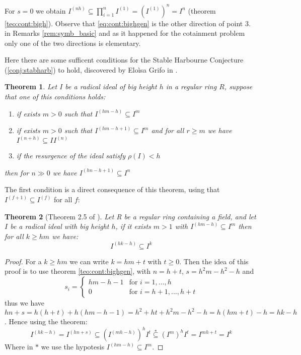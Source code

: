 \documentclass[]{book}
\theoremstyle{plain}
\newtheorem{teo}{Theorem}[section]
\theoremstyle{remark}
\theoremstyle{definition}
\newcommand{\cont}[2]{ I^{(#1)} \subseteq I^{#2}}
\begin{document}
For $ s=0 $ we obtain $ I^{(nh)} \subseteq \prod_{i=1}^{n} I^{(1)} = ( I^{(1)} )^n = I^n$ (theorem \ref{teo:cont:bigh}). Observe that \ref{eq:cont:bighgen} is the other direction of point $ 3. $ in Remarks \ref{rem:symb_basic} and as it happened for the cotainment problem only one of the two directions is elementary. 



Here there are some sufficent conditions for the Stable Harbourne Conjecture (\ref{conj:stabharb}) to hold, discovered by Eloìsa Grifo in \cite{Grifo20}. 


\begin{teo} \label{teo:cont:grifo0}
Let $ I $ be a radical ideal of big height $ h $ in a regular ring $ R $, suppose that one of this conditions holds:
\begin{enumerate}
\item if exists $ m>0 $ such that $ \cont{hm - h}{m} $
\item if exists $ m>0 $ such that $ \cont{hm - h +1 }{m} $ and for all $ r \geq m $ we have $ \cont{n+h }{ }I^{(n)}$
\item if the resurgence of the ideal satisfy $ \rho(I) < h $
\end{enumerate}
then for $ n \gg 0  $ we have $ \cont{hn - h +1}{n} $
\end{teo}

The first condition is a direct consequence of this theorem, using that $ \cont{f+1}{(f)} $ for all $ f $:

\begin{teo}[Theorem 2.5 of \cite{Grifo20}] \label{teo:cont:grifo1}
Let R be a regular ring containing a field, and let $ I $ be a radical ideal with big height $ h $, if it exists $ m>1 $ with $ \cont{hm -h}{m} $ then for all $ k \geq hm $ we have:
$$ \cont{hk - h}{k} $$
\end{teo}

\begin{proof}
For a $ k\geq hm  $ we can write $ k = hm + t $ with $ t\geq 0 $. Then the idea of this proof is to use theorem \ref{teo:cont:bighgen}, with $ n= h+ t $, $ s = h^2m - h^2 - h$ and 
\begin{equation}\label{eq:defsi}
s_i = \begin{cases}
hm-h-1 & \text{for } i = 1 , ... ,h\\
0 &\text{for }  i =h+1 , ..., h + t
\end{cases}
\end{equation}
thus we have $ hn + s = h(h+t) + h(hm-h-1)= h^2 + ht + h^2m - h^2 - h = h(hm + t) - h = hk - h$. Hence using the theorem:
\begin{equation}\label{eq:teo:grifo1}
I^{ ( hk - h)} = I^{ (hn + s)} \subseteq {( I^{ (mh -h ) } )}^h {I}^t \stackrel{*}{\subseteq} (I^m)^h I^t = I^{ mh +t} = I^k
\end{equation}
Where in $\ast$ we use the hypotesis $ \cont{hm-h}{m} $.
\end{proof}
\end{document}
